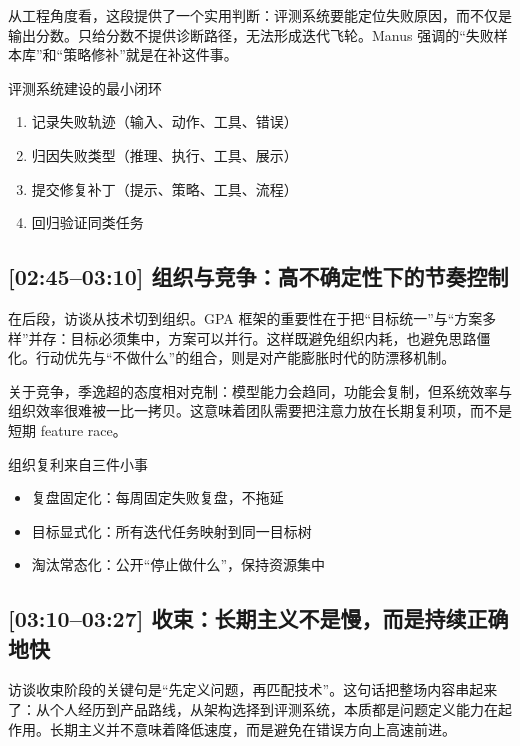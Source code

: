 \documentclass[a4paper]{article}
\begin{document}
从工程角度看，这段提供了一个实用判断：评测系统要能定位失败原因，而不仅是输出分数。只给分数不提供诊断路径，无法形成迭代飞轮。Manus 强调的“失败样本库”和“策略修补”就是在补这件事。

\begin{importantbox}{评测系统建设的最小闭环}
\begin{enumerate}
    \item 记录失败轨迹（输入、动作、工具、错误）
    \item 归因失败类型（推理、执行、工具、展示）
    \item 提交修复补丁（提示、策略、工具、流程）
    \item 回归验证同类任务
\end{enumerate}
\end{importantbox}

\subsection{[02:45--03:10] 组织与竞争：高不确定性下的节奏控制}

在后段，访谈从技术切到组织。GPA 框架的重要性在于把“目标统一”与“方案多样”并存：目标必须集中，方案可以并行。这样既避免组织内耗，也避免思路僵化。行动优先与“不做什么”的组合，则是对产能膨胀时代的防漂移机制。

关于竞争，季逸超的态度相对克制：模型能力会趋同，功能会复制，但系统效率与组织效率很难被一比一拷贝。这意味着团队需要把注意力放在长期复利项，而不是短期 feature race。

\begin{knowledgebox}{组织复利来自三件小事}
\begin{itemize}
    \item 复盘固定化：每周固定失败复盘，不拖延
    \item 目标显式化：所有迭代任务映射到同一目标树
    \item 淘汰常态化：公开“停止做什么”，保持资源集中
\end{itemize}
\end{knowledgebox}

\subsection{[03:10--03:27] 收束：长期主义不是慢，而是持续正确地快}

访谈收束阶段的关键句是“先定义问题，再匹配技术”。这句话把整场内容串起来了：从个人经历到产品路线，从架构选择到评测系统，本质都是问题定义能力在起作用。长期主义并不意味着降低速度，而是避免在错误方向上高速前进。
\end{document}
